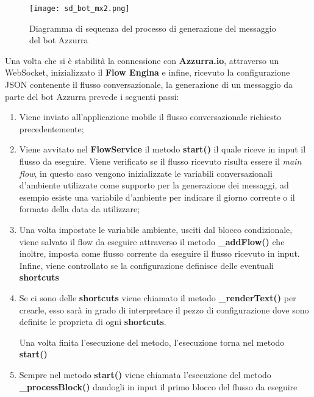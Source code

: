 \begin{figure}[htbp]
	\centering
	\texttt{[image: sd\_bot\_mx2.png]}
	\caption{Diagramma di sequenza del processo di generazione del messaggio del bot Azzurra}\label{fig:mxBot}
\end{figure}
Una volta che si è stabilità la connessione con \textbf{Azzurra.io}, attraverso un \gls{WebSocket}, inizializzato il \textbf{Flow Engina} e infine, ricevuto la configurazione JSON contenente il flusso conversazionale, la generazione di un messaggio da parte del bot Azzurra prevede i seguenti passi:\\
\begin{enumerate}
	\item Viene inviato all’applicazione mobile il flusso conversazionale richiesto precedentemente;
	\item Viene avvitato nel \textbf{FlowService} il metodo \textbf{start()} il quale riceve in input il flusso da eseguire. Viene verificato se il flusso ricevuto risulta essere il \emph{main flow}, in questo caso vengono inizializzate le variabili conversazionali d'ambiente utilizzate come supporto per la generazione dei messaggi, ad esempio esiste una variabile d'ambiente per indicare il giorno corrente o il formato della data da utilizzare;
	\item Una volta impostate le variabile ambiente, usciti dal blocco condizionale, viene salvato il flow da eseguire attraverso il metodo \textbf{\_addFlow()} che inoltre, imposta come flusso corrente da eseguire il flusso ricevuto in input. Infine, viene controllato se la configurazione definisce delle eventuali \textbf{shortcuts}
	\item Se ci sono delle \textbf{shortcuts} viene chiamato il metodo \textbf{\_renderText()} per crearle, esso sarà in grado di interpretare il pezzo di configurazione dove sono definite le proprieta di ogni \textbf{shortcuts}.
	
	Una volta finita l'esecuzione del metodo, l'esecuzione torna nel metodo \textbf{start()}
	\item Sempre nel metodo	\textbf{start()} viene chiamata l'esecuzione del metodo \textbf{\_processBlock()} dandogli in input il primo blocco del flusso da eseguire
	

\end{enumerate}
